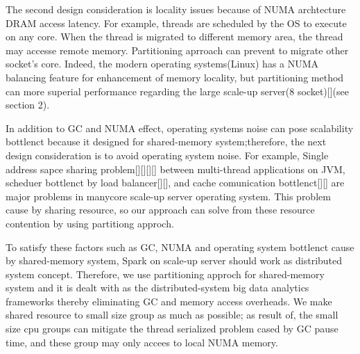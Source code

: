 \ifkor
The second design consideration is locality issues because of NUMA archtecture
DRAM access latency.
For example, threads are scheduled by the OS to execute on any core. When
the thread is migrated to different memory area, the thread may accesse
remote memory.
Partitioning aprroach can prevent to migrate other socket's core.
Indeed, the modern operating systems(Linux) has a NUMA balancing feature for
enhancement of memory locality, but partitioning method can more superial
performance regarding the large scale-up server(8 socket)[](see section 2).
\else

\fi

\ifkor
In addition to GC and NUMA effect, operating systems noise can pose scalability
bottlenct because it designed for shared-memory system;therefore, the next
design consideration is to avoid operating system noise.
For example, Single address sapce sharing problem[][][][] between multi-thread
applications on JVM, scheduer bottlenct by load balancer[][], and cache
comunication bottlenct[][] are major problems in manycore scale-up server
operating system.
This problem cause by sharing resource, so our approach can solve from these
resource contention by using partitiong approch.
\else

\fi

\ifkor
To satisfy these factors such as GC, NUMA and operating system
bottlenct cause by shared-memory system, Spark on scale-up server should work
as distributed system concept. 
Therefore, we use partitioning approch for shared-memory system and it is dealt
with as the distributed-system big data analytics frameworks thereby eliminating
GC and memory access overheads.
We make shared resource to small size group as much as possible; as result of,
the small size cpu groups can mitigate the thread serialized problem cased by GC
pause time, and these group may only accees to local NUMA memory.
\else

